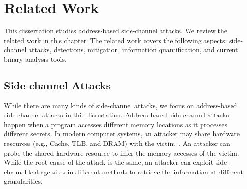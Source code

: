 
\chapter{Related Work}\label{chapter2}
This dissertation studies address-based side-channel attacks. We review the related work in this chapter. The related work covers the following aspects: side-channel attacks, detections, mitigation, information quantification, and current binary analysis tools.

\section{Side-channel Attacks}
While there are many kinds of side-channel attacks, we focus on address-based side-channel attacks in this dissertation.
Address-based side-channel attacks happen when a program accesses different memory locations as it processes different secrets. In modern computer systems, an attacker may share hardware resources (e.g., Cache, TLB, and DRAM) with the victim~\cite{ge2018survey,szefer2019survey}. An attacker can probe the shared hardware resource to infer the memory accesses of the victim. While the root cause of the attack is the same, an attacker can exploit side-channel leakage sites in different methods to retrieve the information at different granularities.

